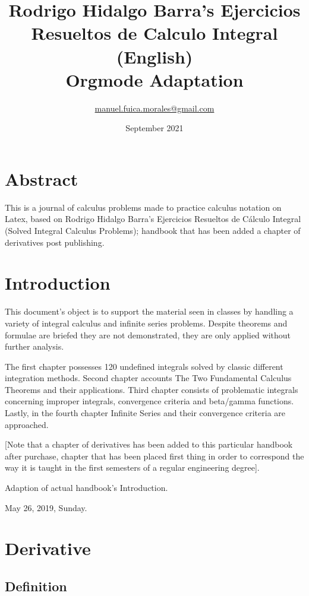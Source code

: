 \documentclass[a4paper,12pt]{article}
\author{\href{mailto:manuel.fuica.morales@gmail.com}{manuel.fuica.morales@gmail.com}}
\date{September 2021}
\title{Rodrigo Hidalgo Barra's Ejercicios Resueltos de Calculo Integral (English)\\\medskip
\large Orgmode Adaptation}
\begin{document}
\maketitle
\setcounter{tocdepth}{3}
\tableofcontents


\section{Abstract}
\label{sec:orgf2d7d35}

This is a journal of calculus problems made to practice calculus notation on
Latex, based on Rodrigo Hidalgo Barra's Ejercicios Resueltos de Cálculo
Integral (Solved Integral Calculus Problems); handbook that has been added
a chapter of derivatives post publishing.

\section{Introduction}
\label{sec:orgc270800}

This document's object is to support the material seen in classes by
handling a variety of integral calculus and infinite series problems.
Despite theorems and formulae are briefed they are not demonstrated, they
are only applied without further analysis.

The first chapter possesses 120 undefined integrals solved by classic
different integration methods. Second chapter accounts The Two Fundamental
Calculus Theorems and their applications. Third chapter consists of
problematic integrals concerning improper integrals, convergence criteria
and beta/gamma functions. Lastly, in the fourth chapter Infinite Series
and their convergence criteria are approached.

[Note that a chapter of derivatives has been added to this particular
handbook after purchase, chapter that has been placed first thing in order
to correspond the way it is taught in the first semesters of a regular
engineering degree].

\hfill Adaption of actual handbook's Introduction.

\hfill May 26, 2019, Sunday.

\newpage

\section{Derivative}
\label{sec:orgf955146}
\subsection{Definition}
\label{sec:org5e4c934}
\end{document}
